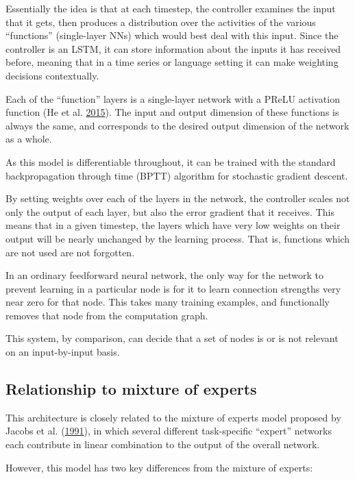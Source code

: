 \documentclass[12pt,twoside]{mitthesis}
\begin{document}
Essentially the idea is that at each timestep, the controller examines
the input that it gets, then produces a distribution over the activities
of the various ``functions'' (single-layer NNs) which would best deal
with this input. Since the controller is an LSTM, it can store
information about the inputs it has received before, meaning that in a
time series or language setting it can make weighting decisions
contextually.

Each of the ``function'' layers is a single-layer network with a PReLU
activation function (He et al.
\protect\hyperlink{ref-he2015delving}{2015}). The input and output
dimension of these functions is always the same, and corresponds to the
desired output dimension of the network as a whole.

As this model is differentiable throughout, it can be trained with the
standard backpropagation through time (BPTT) algorithm for stochastic
gradient descent.

By setting weights over each of the layers in the network, the
controller scales not only the output of each layer, but also the error
gradient that it receives. This means that in a given timestep, the
layers which have very low weights on their output will be nearly
unchanged by the learning process. That is, functions which are not used
are not forgotten.

In an ordinary feedforward neural network, the only way for the network
to prevent learning in a particular node is for it to learn connection
strengths very near zero for that node. This takes many training
examples, and functionally removes that node from the computation graph.

This system, by comparison, can decide that a set of nodes is or is not
relevant on an input-by-input basis.

\subsection{Relationship to mixture of
experts}\label{relationship-to-mixture-of-experts}

This architecture is closely related to the mixture of experts model
proposed by Jacobs et al.
(\protect\hyperlink{ref-jacobs1991task}{1991}), in which several
different task-specific ``expert'' networks each contribute in linear
combination to the output of the overall network.

However, this model has two key differences from the mixture of experts:
\end{document}
